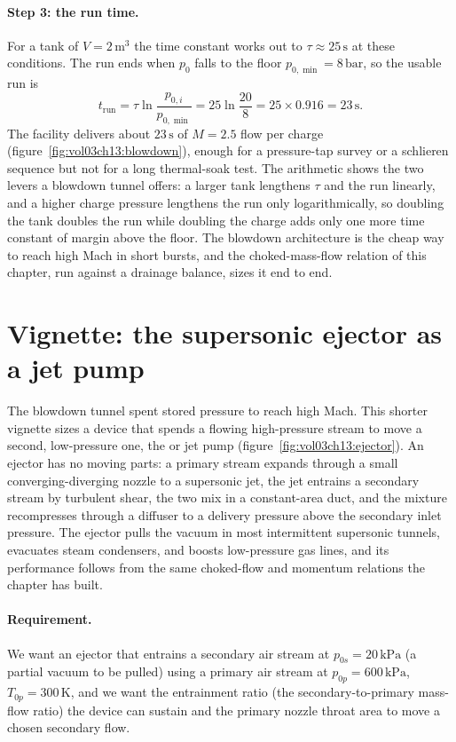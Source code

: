 \paragraph{Step 3: the run time.} For a tank of $V = 2\,\si{\meter}^3$
the time constant works out to $\tau \approx 25\,\si{\second}$ at these
conditions. The run ends when $p_0$ falls to the floor
$p_{0,\min} = 8\,\text{bar}$, so the usable run is
\[
t_{\text{run}} = \tau\ln\frac{p_{0,i}}{p_{0,\min}} =
25\ln\frac{20}{8} = 25\times 0.916 = 23\,\si{\second}.
\]
The facility delivers about $23\,\si{\second}$ of $M = 2.5$ flow per
charge (figure~\ref{fig:vol03ch13:blowdown}), enough for a
pressure-tap survey or a schlieren sequence but not for a long
thermal-soak test. The arithmetic shows the two levers a blowdown
tunnel offers: a larger tank lengthens $\tau$ and the run linearly,
and a higher charge pressure lengthens the run only logarithmically,
so doubling the tank doubles the run while doubling the charge adds
only one more time constant of margin above the floor. The blowdown
architecture is the cheap way to reach high Mach in short bursts, and
the choked-mass-flow relation of this chapter, run against a drainage
balance, sizes it end to end.

\section{Vignette: the supersonic ejector as a jet pump}

The blowdown tunnel spent stored pressure to reach high Mach. This
shorter vignette sizes a device that spends a flowing high-pressure
stream to move a second, low-pressure one, the  or jet pump (figure~\ref{fig:vol03ch13:ejector}). An ejector
has no moving parts: a primary stream expands through a small
converging-diverging nozzle to a supersonic jet, the jet entrains a
secondary stream by turbulent shear, the two mix in a constant-area
duct, and the mixture recompresses through a diffuser to a delivery
pressure above the secondary inlet pressure. The ejector pulls the
vacuum in most intermittent supersonic tunnels, evacuates steam
condensers, and boosts low-pressure gas lines, and its performance
follows from the same choked-flow and momentum relations the chapter has
built.



\paragraph{Requirement.} We want an ejector that entrains a secondary
air stream at $p_{0s} = 20\,\text{kPa}$ (a partial vacuum to be pulled)
using a primary air stream at $p_{0p} = 600\,\text{kPa}$,
$T_{0p} = 300\,\si{\kelvin}$, and we want the entrainment ratio (the
secondary-to-primary mass-flow ratio) the device can sustain and the
primary nozzle throat area to move a chosen secondary flow.

